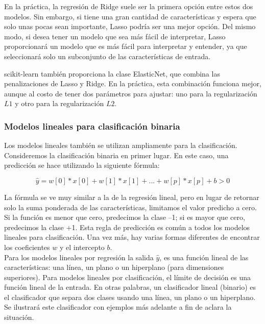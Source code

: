 {En la práctica, la regresión de Ridge suele ser la primera opción entre estos dos modelos.
Sin embargo, si tiene una gran cantidad de características y espera que solo unas pocas sean
importante, Lasso podría ser una mejor opción. Del mismo modo, si desea tener un modelo que sea más fácil de interpretar, Lasso proporcionará un modelo que es más fácil para interpretar y entender, ya que seleccionará solo un subconjunto de las características de entrada.  

scikit-learn también proporciona la clase ElasticNet, que combina las penalizaciones de Lasso y Ridge.  En la práctica, esta combinación funciona mejor, aunque al costo de tener dos parámetros para ajustar: uno para la regularización $L1$ y otro para la regularización $L2$.
 
\subsubsection{Modelos lineales para clasificación binaria}\label{Mlineales}

Los modelos lineales también se utilizan ampliamente para la clasificación. Consideremos la clasificación  binaria  en primer lugar. En este caso,  una predicción  se hace  utilizando la siguiente fórmula:

\[ \hat{y} = w[0] * x[0] +w[1] * x[1] + ... + w[p] * x [p] + b > 0  \]

La fórmula se ve muy similar a la de la regresión lineal, pero en lugar de 
retornar solo la suma ponderada de las características, limitamos el valor predicho a cero.  Si la función es menor que cero, predecimos la clase –1; si es mayor que cero, 
predecimos la clase +1. Esta regla de predicción es común a todos los modelos lineales para clasificación.
 Una vez más, hay varias formas diferentes de encontrar los coeficientes $w$ y el intercepto $b$.\\


Para los modelos lineales por regresión la salida  $\hat{y}$, es una función lineal de las características: una línea, un plano o un hiperplano (para dimensiones superiores). Para modelos lineales por clasificación, el límite de decisión es una función lineal de la entrada. En otras palabras, un clasificador lineal (binario) es el clasificador  que separa dos clases usando una línea, un plano o un hiperplano. Se ilustrará este clasificador con ejemplos más adelante a fin de aclara la situación. \\

}
